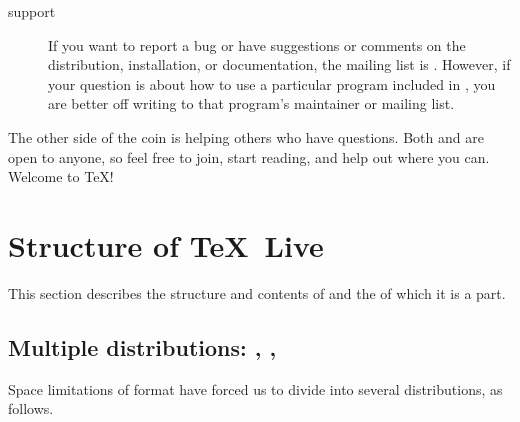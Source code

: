 \documentclass{article}
\begin{document}
\begin{description}
\item [\TL{} support] If you want to report a bug or have
suggestions or comments on the \TL{} distribution, installation, or
documentation, the mailing list is .  However,
if your question is about how to use a particular program included in
\TL{}, you are better off writing to that program's maintainer or
mailing list.

\end{description}

The other side of the coin is helping others who have questions.  Both
 and  are open to anyone, so feel
free to join, start reading, and help out where you can.  Welcome to
\TeX{}!


\section{Structure of \protect\TeX\protect\ Live}
\label{sec:struct-tl}

This section describes the structure and contents of \TL{} and the
\TK{} of which it is a part.

\subsection{Multiple distributions: \protect{},
            \protect{},
            \protect{}}
\label{sec:multiple-dist}

Space limitations of  format have forced us to divide
\TK{} into several distributions, as follows.
\end{document}
